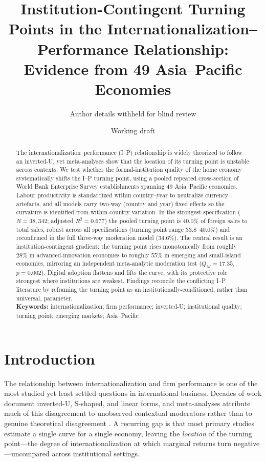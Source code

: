 \documentclass[12pt,a4paper]{article}
\title{Institution-Contingent Turning Points in the
Internationalization--Performance Relationship: Evidence from 49
Asia--Pacific Economies}
\author{Author details withheld for blind review}
\date{Working draft}
\begin{document}
\maketitle

\begin{abstract}
\noindent The internationalization--performance (I--P) relationship is
widely theorized to follow an inverted-U, yet meta-analyses show that the
location of its turning point is unstable across contexts. We test whether
the formal-institution quality of the home economy systematically shifts
the I--P turning point, using a pooled repeated cross-section of World Bank
Enterprise Survey establishments spanning 49 Asia--Pacific economies. Labour
productivity is standardized within country--year to neutralize currency
artefacts, and all models carry two-way (country and year) fixed effects so
the curvature is identified from within-country variation. In the strongest
specification ($N=38{,}342$; adjusted $R^2 = 0.677$) the pooled turning
point is $40.0\%$ of foreign sales to total sales, robust across all
specifications (turning point range $33.8$--$40.0\%$) and reconfirmed in the
full three-way moderation model ($34.6\%$). The central result is an
institution-contingent gradient: the turning point rises monotonically from
roughly $28\%$ in advanced-innovation economies to roughly $55\%$ in
emerging and small-island economies, mirroring an independent meta-analytic
moderation test ($Q_M = 17.35$, $p = 0.002$). Digital adoption flattens and
lifts the curve, with its protective role strongest where institutions are
weakest. Findings reconcile the conflicting I--P literature by reframing the
turning point as an institutionally-conditioned, rather than universal,
parameter.\\[4pt]
\textbf{Keywords:} internationalization; firm performance; inverted-U;
institutional quality; turning point; emerging markets; Asia--Pacific
\end{abstract}

\section{Introduction}
The relationship between internationalization and firm performance is one of
the most studied yet least settled questions in international business.
Decades of work document inverted-U, S-shaped, and linear forms, and
meta-analyses attribute much of this disagreement to unobserved contextual
moderators rather than to genuine theoretical disagreement
\citep{kirca2012,marano2016,contractor2012}. A recurring gap is that most
primary studies estimate a single curve for a single economy, leaving the
\emph{location} of the turning point---the degree of internationalization at
which marginal returns turn negative---uncompared across institutional
settings.
\end{document}
